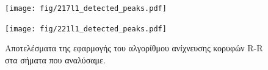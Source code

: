 \documentclass[11pt,a4paper]{article}
\begin{document}
\begin{figure}[H]
\centering
\begin{minipage}{0.48\textwidth}
	\centering
	\texttt{[image: fig/217l1\_detected\_peaks.pdf]}
\end{minipage}
\begin{minipage}{0.48\textwidth}
	\centering
	\texttt{[image: fig/221l1\_detected\_peaks.pdf]}
\end{minipage}
\vfill
\caption{Αποτελέσματα της εφαρμογής του αλγορίθμου ανίχνευσης κορυφών R-R στα σήματα που αναλύσαμε.}
\label{fig:detected_peaks}
\end{figure}
\end{document}

